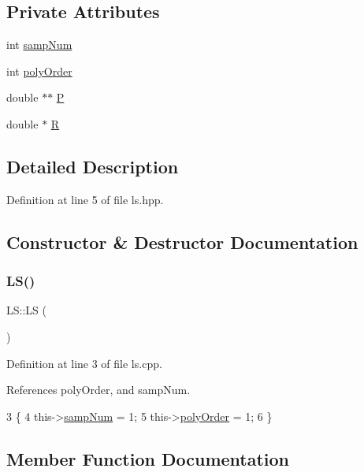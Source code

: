\subsection*{Private Attributes}
\begin{DoxyCompactItemize}
\item 
int \hyperlink{class_l_s_a333c6e0be784cffd2f97f46803c5ba15}{samp\+Num}
\item 
int \hyperlink{class_l_s_aecf61c51ef6717acc81b737e298e4236}{poly\+Order}
\item 
double $\ast$$\ast$ \hyperlink{class_l_s_aef5aafb3950204592111d32c93721aa3}{P}
\item 
double $\ast$ \hyperlink{class_l_s_ade8c978a7d99f10950790c0dfec9f556}{R}
\end{DoxyCompactItemize}


\subsection{Detailed Description}


Definition at line 5 of file ls.\+hpp.



\subsection{Constructor \& Destructor Documentation}
\mbox{\label{class_l_s_a94d725a8af0cd80b3dfdabf57fea4c4b}} 
\subsubsection{\texorpdfstring{L\+S()}{LS()}}
{\footnotesize\ttfamily L\+S\+::\+LS (\begin{DoxyParamCaption}{ }\end{DoxyParamCaption})}



Definition at line 3 of file ls.\+cpp.



References poly\+Order, and samp\+Num.


\begin{DoxyCode}
3        \{
4     this->\hyperlink{class_l_s_a333c6e0be784cffd2f97f46803c5ba15}{sampNum}   = 1;
5     this->\hyperlink{class_l_s_aecf61c51ef6717acc81b737e298e4236}{polyOrder} = 1;
6 \}
\end{DoxyCode}


\subsection{Member Function Documentation}
\mbox{\label{class_l_s_ac3843acd150a8668c7bdff35f080d902}} 
